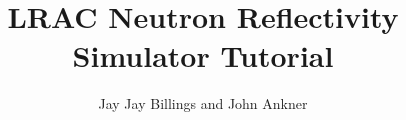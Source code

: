 \documentclass{report}
\begin{document}
\title{LRAC Neutron Reflectivity Simulator Tutorial}
\author{Jay Jay Billings and John Ankner}
\maketitle


\end{document}
